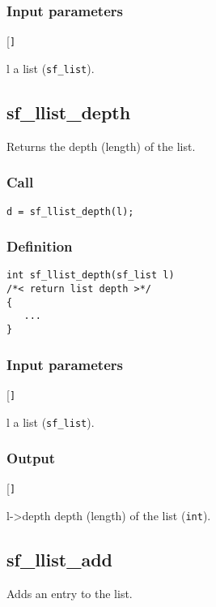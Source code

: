 \subsubsection*{Input parameters}
\begin{desclist}{\tt }{\quad}[\tt ]
   \setlength\itemsep{0pt}
   \item[l] a list (\texttt{sf\_list}).  
\end{desclist}




\subsection{{sf\_llist\_depth}}
Returns the depth (length) of the list.

\subsubsection*{Call}
\begin{verbatim}d = sf_llist_depth(l);\end{verbatim}

\subsubsection*{Definition}
\begin{verbatim}
int sf_llist_depth(sf_list l)
/*< return list depth >*/
{
   ...
}
\end{verbatim}

\subsubsection*{Input parameters}
\begin{desclist}{\tt }{\quad}[\tt ]
   \setlength\itemsep{0pt}
   \item[l] a list (\texttt{sf\_list}).  
\end{desclist}

\subsubsection*{Output}
\begin{desclist}{\tt }{\quad}[\tt ]
   \setlength\itemsep{0pt}
   \item[l->depth] depth (length) of the list (\texttt{int}).  
\end{desclist}




\subsection{{sf\_llist\_add}}
Adds an entry to the list.

